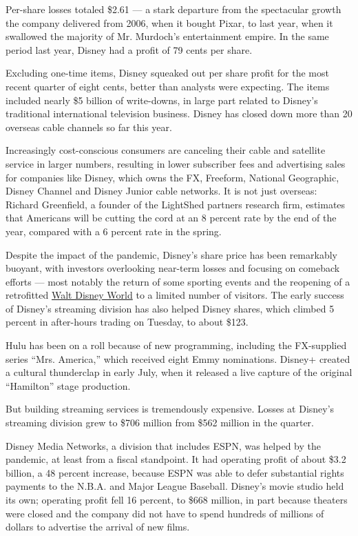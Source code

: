 Per-share losses totaled \$2.61 --- a stark departure from the
spectacular growth the company delivered from 2006, when it bought
Pixar, to last year, when it swallowed the majority of Mr. Murdoch's
entertainment empire. In the same period last year, Disney had a profit
of 79 cents per share.

Excluding one-time items, Disney squeaked out per share profit for the
most recent quarter of eight cents, better than analysts were expecting.
The items included nearly \$5 billion of write-downs, in large part
related to Disney's traditional international television business.
Disney has closed down more than 20 overseas cable channels so far this
year.

Increasingly cost-conscious consumers are canceling their cable and
satellite service in larger numbers, resulting in lower subscriber fees
and advertising sales for companies like Disney, which owns the FX,
Freeform, National Geographic, Disney Channel and Disney Junior cable
networks. It is not just overseas: Richard Greenfield, a founder of the
LightShed partners research firm, estimates that Americans will be
cutting the cord at an 8 percent rate by the end of the year, compared
with a 6 percent rate in the spring.

Despite the impact of the pandemic, Disney's share price has been
remarkably buoyant, with investors overlooking near-term losses and
focusing on comeback efforts --- most notably the return of some
sporting events and the reopening of a retrofitted
\href{https://www.nytimes3xbfgragh.onion/2020/07/11/business/florida-coronavirus-disney-world-reopening.html}{Walt
Disney World} to a limited number of visitors. The early success of
Disney's streaming division has also helped Disney shares, which climbed
5 percent in after-hours trading on Tuesday, to about \$123.

Hulu has been on a roll because of new programming, including the
FX-supplied series ``Mrs. America,'' which received eight Emmy
nominations. Disney+ created a cultural thunderclap in early July, when
it released a live capture of the original ``Hamilton'' stage
production.

But building streaming services is tremendously expensive. Losses at
Disney's streaming division grew to \$706 million from \$562 million in
the quarter.

Disney Media Networks, a division that includes ESPN, was helped by the
pandemic, at least from a fiscal standpoint. It had operating profit of
about \$3.2 billion, a 48 percent increase, because ESPN was able to
defer substantial rights payments to the N.B.A. and Major League
Baseball. Disney's movie studio held its own; operating profit fell 16
percent, to \$668 million, in part because theaters were closed and the
company did not have to spend hundreds of millions of dollars to
advertise the arrival of new films.

